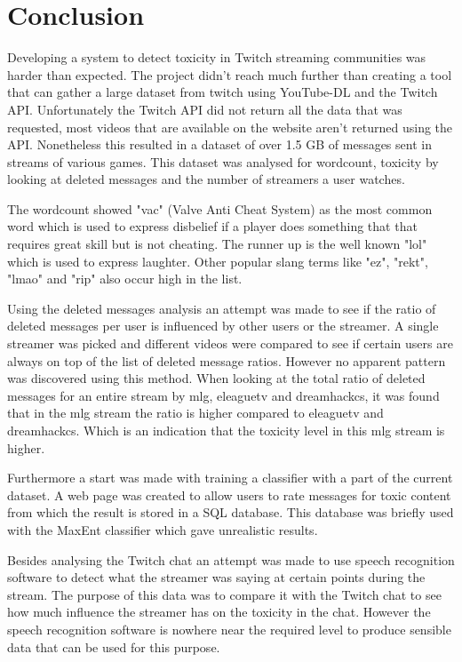 \documentclass[final]{report}
\begin{document}
\chapter{Conclusion}
\label{ch:conclusion}

Developing a system to detect toxicity in Twitch streaming communities was harder than expected. The project didn't reach much further than creating a tool that can gather a large dataset from twitch using YouTube-DL and the Twitch API. Unfortunately the Twitch API did not return all the data that was requested, most videos that are available on the website aren't returned using the API. Nonetheless this resulted in a dataset of over 1.5 GB of messages sent in streams of various games. This dataset was analysed for wordcount, toxicity by looking at deleted messages and the number of streamers a user watches.

The wordcount showed "vac" (Valve Anti Cheat System) as the most common word which is used to express disbelief if a player does something that that requires great skill but is not cheating. The runner up is the well known "lol" which is used to express laughter. Other popular slang terms like "ez", "rekt", "lmao" and "rip" also occur high in the list.

Using the deleted messages analysis an attempt was made to see if the ratio of deleted messages per user is influenced by other users or the streamer. A single streamer was picked and different videos were compared to see if certain users are always on top of the list of deleted message ratios. However no apparent pattern was discovered using this method. When looking at the total ratio of deleted messages for an entire stream by mlg, eleaguetv and dreamhackcs, it was found that in the mlg stream the ratio is higher compared to eleaguetv and dreamhackcs. Which is an indication that the toxicity level in this mlg stream is higher.

Furthermore a start was made with training a classifier with a part of the current dataset. A web page was created to allow users to rate messages for toxic content from which the result is stored in a SQL database. This database was briefly used with the MaxEnt classifier which gave unrealistic results.

Besides analysing the Twitch chat an attempt was made to use speech recognition software to detect what the streamer was saying at certain points during the stream. The purpose of this data was to compare it with the Twitch chat to see how much influence the streamer has on the toxicity in the chat. However the speech recognition software is nowhere near the required level to produce sensible data that can be used for this purpose. 
\end{document}
